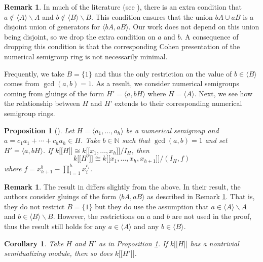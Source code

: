 \documentclass{amsart}
\newcommand{\NN}{\mathbb N}
\newcommand{\ldb}{\mathopen{[\![}} %
\newcommand{\rdb}{\mathclose{]\!]}} %
\theoremstyle{plain}
\newtheorem{prop}[theorem]{Proposition}
\newtheorem{cor}[theorem]{Corollary}
\theoremstyle{definition}
\newtheorem{remark}[theorem]{Remark}
\numberwithin{theorem}{section}
\numberwithin{equation}{section}
\numberwithin{equation}{theorem}
\begin{document}
\begin{remark}\label{rem:nongen}
In much of the literature (see \cite{GS19,N13}), there is an extra condition that $a \notin \langle A \rangle \backslash A$ and $b \notin \langle B \rangle \backslash B$. This condition ensures that the union $b A \cup a B$ is a disjoint union \cite[Lemma 2.1]{GS19} of generators for $\langle b A, a B \rangle$. Our work does not depend on this union being disjoint, so we drop the extra condition on $a$ and $b$. A consequence of dropping this condition is that the corresponding Cohen presentation of the numerical semigroup ring is not necessarily minimal.
\end{remark}

Frequently, we take $B = \{1\}$ and thus the only restriction on the value of $b \in \langle B \rangle$ comes from $\gcd(a,b)=1$. As a result, we consider numerical semigroups coming from gluings of the form $ H' = \langle a , b H \rangle$ where $H = \langle A \rangle$. 
Next, we see how the relationship between $H$ and $H’$ extends to their corresponding numerical semigroup rings.


\begin{prop}[{\cite[Prop 2.2]{GS19}}] \label{prop:defIdeal}
Let $H = \langle a_1, \ldots, a_h\rangle$ be a numerical semigroup and $a = c_1 a_1 + \cdots + c_h a_h \in H $. Take $b \in \NN$ such that $\gcd(a,b) = 1$ and set $H' = \langle a , bH \rangle$. If $k \ldb H \rdb \cong k \ldb x_1, \ldots, x_h \rdb/ I_{H}$, then $$k \ldb H' \rdb \cong k \ldb x_1, \ldots, x_h, x_{h + 1} \rdb/ (I_{H}, f)$$ where $f = x_{h+1}^b - \prod_{i = 1}^h x_i^{c_i}$.
\end{prop}

\begin{remark}
The result in \cite[Prop 2.2]{GS19} differs slightly from the above. In their result, the authors consider gluings of the form $\langle bA, aB\rangle$ as described in Remark \ref{rem:nongen}. That is, they do not restrict $B = \{1\}$ but they do use the assumption that $a \in \langle A \rangle \backslash A$ and $b \in \langle B \rangle \backslash B$. However, the restrictions on $a$ and $b$ are not used in the proof, thus the result still holds for any $a \in \langle A \rangle$ and any $b \in \langle B \rangle$.
\end{remark}



\begin{cor}\label{cor:highermult}
Take $H$ and $H'$ as in Proposition \ref{prop:defIdeal}. If $k \ldb H \rdb$ has a nontrivial semidualizing module, then so does $k \ldb H' \rdb$.
\end{cor}
\end{document}
